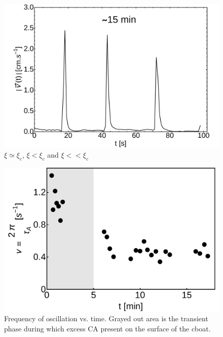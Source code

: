 \documentclass[journal=langd5, manuscript=article, layout=twocolumn]{achemso}
\begin{document}
\begin{figure}[ht]
\begin{minipage}[c]{0.3\linewidth}
	\end{minipage}
	\begin{minipage}[c]{0.3\linewidth}
		\centering
		\includegraphics[width=\textwidth]{uvst_65dypcm_c.pdf}
	\end{minipage}
	\caption{$\xi \simeq \xi_{c}$, $\xi < \xi_{c}$ and $\xi << \xi_{c}$}\label{fig:uvst_65dypcm}
\end{figure}
\begin{figure}[ht] 
    \begin{center}
       \includegraphics[scale=0.4]{freqvst.pdf}
    \end{center}
    \caption{Frequency of oscillation vs. time. Grayed out area is the transient phase during which excess CA present on the surface of the cboat.}
    \label{fig:freqvst}
\end{figure}
\end{document}
